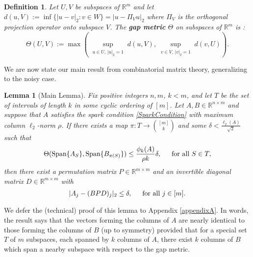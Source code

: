 \documentclass[journal, onecolumn]{IEEEtran}
\newtheorem{lemma}{Lemma}
\newtheorem{definition}{Definition}
\begin{document}
\begin{definition}\label{GapMetricDef}
Let $U, V$ be subspaces of $\mathbb{R}^m$ and let $d(u,V) := \inf\{|u-v|_2: v \in W\} = |u - \Pi_V u|_2$ where $\Pi_V$ is the orthogonal projection operator onto subspace $V$. The \textbf{gap metric} $\Theta$ on subspaces of $\mathbb{R}^{m}$ is \cite{akhiezer2013theory}:
\begin{equation}\label{SubspaceMetric}
\Theta(U,V) := \max\left( \sup_{\substack{u \in U, \, |u|_2 = 1}} d(u,V), \sup_{\substack{v \in V, \, |v|_2 = 1}} d(v,U) \right).
\end{equation}
\end{definition}

We are now state our main result from combinatorial matrix theory, generalizing \cite[Lemma 1]{Hillar15} to the noisy case.

\begin{lemma}[Main Lemma]\label{MainLemma}
Fix positive integers $n, m$, $k < m$, and let $T$ be the set of intervals of length $k$ in some cyclic ordering of $[m]$. Let $A, B \in \mathbb{R}^{n \times m}$ and suppose that $A$ satisfies the spark condition \eqref{SparkCondition} with maximum column $\ell_2$-norm $\rho$.  If there exists a map $\pi: T \to {[m] \choose k}$ and some $\delta < \frac{\ell_{2}(A)}{\sqrt{2}}$ such that 
\begin{equation}\label{GapUpperBound}
\Theta(\text{\rm Span}\{A_{S}\}, \text{\rm Span}\{B_{\pi(S)}\}) \leq \frac{ \phi_k(A) }{\rho k} \delta, \indent \text{for all } S \in T,
\end{equation}
%
then there exist a permutation matrix $P \in \mathbb{R}^{m \times m}$ and an invertible diagonal matrix $D \in \mathbb{R}^{m \times m}$ with
\begin{align}
|A_j - (BPD)_j|_2 \leq \delta, \indent \text{for all } j \in [m].
\end{align}
\end{lemma}
We defer the (technical) proof of this lemma to Appendix \ref{appendixA}. In words, the result says that the vectors forming the columns of $A$ are nearly identical to those forming the columns of $B$ (up to symmetry) provided that for a special set $T$ of $m$ subspaces, each spanned by $k$ columns of $A$, there exist $k$ columns of $B$ which span a nearby subspace with respect to the gap metric.
\end{document}
